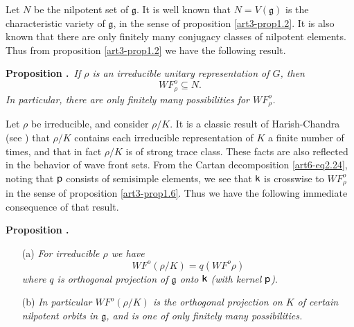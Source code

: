 Let $N$ be the nilpotent set of $\mathfrak{g}$. It is well known that $N=V(\mathfrak{g})$ is the characteristic variety of $\mathfrak{g}$, in the sense of proposition \ref{art3-prop1.2}. It is also known that there are only finitely many conjugacy classes of nilpotent elements. Thus from proposition \ref{art3-prop1.2} we have the following result.

\medskip
\noindent
{\bf Proposition .\label{art3-prop2.4}}~{\em If $\rho$ is an irreducible unitary representation of $G$, then}
\begin{equation*}
WF^{o}_{\rho}\subseteq N.\tag{2.25}\label{art3-eq2.25}
\end{equation*}
{\em In particular, there are only finitely many possibilities for $WF^{o}_{\rho}$.}

Let $\rho$ be irreducible, and consider $\rho/K$. It is a classic result of Harish-Chandra (see \cite{art3-W}) that $\rho/K$ contains each irreducible representation of $K$ a finite number of times, and that in fact $\rho/K$ is of strong trace class. These facts are also reflected in the behavior of wave front sets. From the Cartan decomposition \eqref{art6-eq2.24}, noting that $\mathsf{p}$ consists of semisimple elements, we see that $\mathsf{k}$ is crosswise to $WF^{o}_{\rho}$ in the sense of proposition \ref{art3-prop1.6}. Thus we have the following immediate consequence of that result.

\medskip
\noindent
{\bf Proposition .\label{art3-prop2.5}}
\begin{itemize}
\item[(a)] {\em For irreducible $\rho$ we have}
\begin{equation*}
WF^{o}(\rho/K)=q(WF^{o}\rho)\tag{2.26}\label{art3-eq2.26}
\end{equation*}
{\em where $q$ is orthogonal projection of $\mathfrak{g}$ onto $\mathsf{k}$ (with kernel $\mathsf{p}$)}.

\item[(b)] {\em In particular $WF^{o}(\rho/K)$ is the orthogonal projection on $K$ of certain nilpotent orbits in $\mathfrak{g}$, and is one of only finitely many possibilities.}
\end{itemize}

